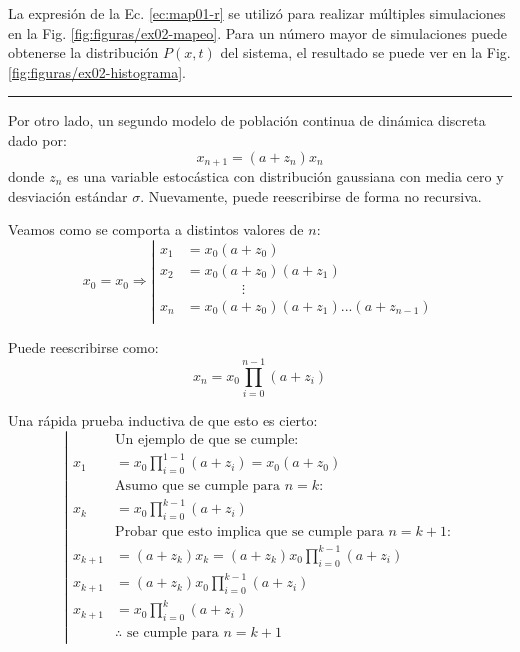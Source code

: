 \documentclass[twocolumn,aps,prl]{revtex4-1}
\newcommand*\sepline{%
  \begin{center}
    \rule[1ex]{.5\textwidth}{.1pt}
  \end{center}}
\begin{document}
La expresión de la Ec. \ref{ec:map01-r} se utilizó para realizar múltiples simulaciones en la Fig. \ref{fig:figuras/ex02-mapeo}. Para un número mayor de simulaciones puede obtenerse la distribución $P(x,t)$ del sistema, el resultado se puede ver en la Fig. \ref{fig:figuras/ex02-histograma}.
\sepline
Por otro lado, un segundo modelo de población continua de dinámica discreta dado por:
\begin{equation}\label{ec:map02}
  x_{n+1} = (a + z_n) x_n
\end{equation}
donde $z_n$ es una variable estocástica con distribución gaussiana con media cero y desviación estándar $\sigma$. Nuevamente, puede reescribirse de forma no recursiva.

Veamos como se comporta a distintos valores de $n$:
\begin{equation}
  x_0 = x_0 \Rightarrow
  \left\vert\begin{aligned}
    x_1 &= x_0 (a + z_0) \\
    x_2 &= x_0 (a + z_0) (a + z_1)\\
        & \qquad \qquad \vdots \\
    x_n &= x_0 (a + z_0) (a + z_1) ... (a + z_{n-1})\\
  \end{aligned}\right.
\end{equation}

Puede reescribirse como:
\begin{equation}\label{ec:map02-r}
  x_n = x_0 \prod_{i=0}^{n-1} (a + z_i)
\end{equation}

Una rápida prueba inductiva de que esto es cierto:
\begin{equation}
  \left|
  \begin{aligned}
    & \text{Un ejemplo de que se cumple:} \\
    x_1 &= x_0 \prod_{i=0}^{1-1} (a + z_i) = x_0 (a + z_0)\\
    & \text{Asumo que se cumple para $n=k$:} \\
    x_k &= x_0 \prod_{i=0}^{k-1} (a + z_i)\\
    & \text{Probar que esto implica que se cumple para $n=k+1$:} \\
    x_{k+1} &= (a + z_k) x_k = (a + z_k) x_0 \prod_{i=0}^{k-1} (a + z_i) \\
    x_{k+1} &= (a + z_k) x_0 \prod_{i=0}^{k-1} (a + z_i) \\
    x_{k+1} &= x_0 \prod_{i=0}^{k} (a + z_i) \\
    & \text{$\therefore$ se cumple para $n=k+1$}
  \end{aligned}
  \right.  
\end{equation}
\end{document}
